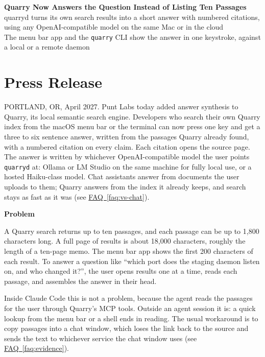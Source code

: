 \documentclass[11pt,letterpaper]{article}
\newcommand{\prsection}[1]{%
  \vspace{1em}%
  {\large\bfseries\color{SectionBlue}#1}%
  \vspace{0.3em}\par%
}
\newcommand{\faqref}[1]{\hyperref[#1]{FAQ~\ref*{#1}}}
\begin{document}
\begin{center}
  {\LARGE\bfseries\color{SectionBlue} Quarry Now Answers the Question Instead of Listing Ten Passages} \\[0.8em]
  {\large\color{AccentGray} quarryd turns its own search results into a short answer with numbered citations, using any OpenAI-compatible model on the same Mac or in the cloud} \\[0.3em]
  {\large\color{AccentGray} The menu bar app and the \texttt{quarry} CLI show the answer in one keystroke, against a local or a remote daemon}
\end{center}

\vspace{0.5em}


\section*{Press Release}

PORTLAND, OR, April 2027. Punt Labs today added answer synthesis to Quarry,
its local semantic search engine. Developers who search their own Quarry index
from the macOS menu bar or the terminal can now press one key and get a three
to six sentence answer, written from the passages Quarry already found, with a
numbered citation on every claim. Each citation opens the source page. The
answer is written by whichever OpenAI-compatible model the user points
\texttt{quarryd} at: Ollama or LM Studio on the same machine for fully local
use, or a hosted Haiku-class model. Chat assistants answer from documents
the user uploads to them; Quarry answers from the index it already keeps, and
search stays as fast as it was (see \faqref{faq:vs-chat}).

\prsection{Problem}

A Quarry search returns up to ten passages, and each passage can be up to
1{,}800 characters long. A full page of results is about 18{,}000 characters,
roughly the length of a ten-page memo. The menu bar app shows the first 200
characters of each result. To answer a question like ``which port does the
staging daemon listen on, and who changed it?'', the user opens results one at
a time, reads each passage, and assembles the answer in their head.

Inside Claude Code this is not a problem, because the agent reads the
passages for the user through Quarry's MCP tools. Outside an agent session it
is: a quick lookup from the menu bar or a shell ends in reading. The usual
workaround is to copy passages into a chat window, which loses the link back
to the source and sends the text to whichever service the chat window uses
(see \faqref{faq:evidence}).
\end{document}
